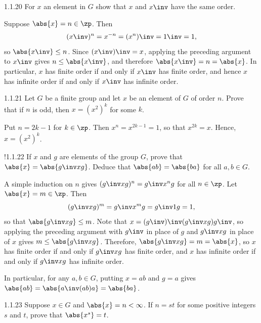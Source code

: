 \begin{exercise}{1.1.20}
    For $x$ an element in $G$ show that $x$ and $x\inv$ have the same order.
\end{exercise}

\begin{sol}
    Suppose $\abs{x} = n \in \zp$.
	Then
    \[
        (x\inv)^n = x^{-n} = (x^n)\inv = 1\inv = 1,
    \]
    so $\abs{x\inv} \leq n$.
    Since $(x\inv)\inv = x$, applying the preceding argument to $x\inv$ gives $n \leq \abs{x\inv}$, and therefore $\abs{x\inv} = n = \abs{x}$.
	In particular, $x$ has finite order if and only if $x\inv$ has finite order, and hence $x$ has infinite order if and only if $x\inv$ has infinite order.
\end{sol}

\begin{exercise}{1.1.21}
    Let $G$ be a finite group and let $x$ be an element of $G$ of order $n$.
	Prove that if $n$ is odd, then $x = (x^2)^k$ for some $k$.
\end{exercise}

\begin{sol}
    Put $n = 2k - 1$ for $k \in \zp$.
	Then $x^n = x^{2k - 1} = 1$, so that $x^{2k} = x$.
	Hence, $x = (x^2)^k$.
\end{sol}

\begin{exercise}!{1.1.22}
    If $x$ and $g$ are elements of the group $G$, prove that $\abs{x} = \abs{g\inv x g}$.
	Deduce that $\abs{ab} = \abs{ba}$ for all $a, b \in G$.
\end{exercise}

\begin{sol}
    A simple induction on $n$ gives $(g\inv x g)^n = g\inv x^n g$ for all $n \in \zp$.
	Let $\abs{x} = m \in \zp$.
	Then
    \[
    	(g\inv x g)^m = g\inv x^m g = g\inv 1 g = 1,
    \]
    so that $\abs{g\inv x g} \leq m$.
	Note that $x = (g\inv)\inv(g\inv x g) g\inv$, so applying the preceding argument with $g\inv$ in place of $g$ and $g\inv x g$ in place of $x$ gives $m \leq \abs{g\inv x g}$.
    Therefore, $\abs{g\inv x g} = m = \abs{x}$, so $x$ has finite order if and only if $g\inv x g$ has finite order, and $x$ has infinite order if and only if $g\inv x g$ has infinite order.

    In particular, for any $a, b \in G$, putting $x = ab$ and $g = a$ gives $\abs{ab} = \abs{a\inv (ab) a} = \abs{ba}$.
\end{sol}

\begin{exercise}{1.1.23}
    Suppose $x \in G$ and $\abs{x} = n < \infty$.
	If $n = st$ for some positive integers $s$ and $t$, prove that $\abs{x^s} = t$.
\end{exercise}

